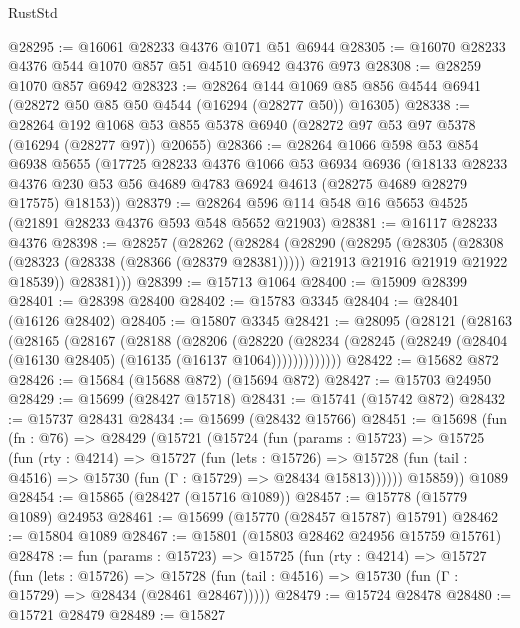 \begin{lexlean}{RustStd}
\begin{coremodule}
@28295 := @16061 @28233 @4376 @1071 @51 @6944
@28305 := @16070 @28233 @4376 @544 @1070 @857 @51 @4510 @6942 @4376 @973
@28308 := @28259 @1070 @857 @6942
@28323 := @28264
    @144
    @1069
    @85
    @856
    @4544
    @6941
    (@28272 @50 @85 @50 @4544 (@16294 (@28277 @50)) @16305)
@28338 := @28264
    @192
    @1068
    @53
    @855
    @5378
    @6940
    (@28272 @97 @53 @97 @5378 (@16294 (@28277 @97)) @20655)
@28366 := @28264
    @1066
    @598
    @53
    @854
    @6938
    @5655
    (@17725
      @28233
      @4376
      @1066
      @53
      @6934
      @6936
      (@18133
        @28233
        @4376
        @230
        @53
        @56
        @4689
        @4783
        @6924
        @4613
        (@28275 @4689 @28279 @17575)
        @18153))
@28379 := @28264 @596 @114 @548 @16 @5653 @4525 (@21891 @28233 @4376 @593 @548 @5652 @21903)
@28381 := @16117 @28233 @4376
@28398 := @28257
    (@28262
      (@28284
        (@28290
          (@28295
            (@28305
              (@28308 (@28323 (@28338 (@28366 (@28379 @28381)))))
              @21913
              @21916
              @21919
              @21922
              @18539))
          @28381)))
@28399 := @15713 @1064
@28400 := @15909 @28399
@28401 := @28398 @28400
@28402 := @15783 @3345
@28404 := @28401 (@16126 @28402)
@28405 := @15807 @3345
@28421 := @28095
    (@28121
      (@28163
        (@28165
          (@28167
            (@28188
              (@28206
                (@28220
                  (@28234 (@28245 (@28249 (@28404 (@16130 @28405) (@16135 (@16137 @1064)))))))))))))
@28422 := @15682 @872
@28426 := @15684 (@15688 @872) (@15694 @872)
@28427 := @15703 @24950
@28429 := @15699 (@28427 @15718)
@28431 := @15741 (@15742 @872)
@28432 := @15737 @28431
@28434 := @15699 (@28432 @15766)
@28451 := @15698
    (fun (fn : @76) =>
    @28429
      (@15721
        (@15724
          (fun (params : @15723) =>
          @15725
            (fun (rty : @4214) =>
            @15727
              (fun (lets : @15726) =>
              @15728 (fun (tail : @4516) => @15730 (fun (Γ : @15729) => @28434 @15813))))))
        @15859))
    @1089
@28454 := @15865 (@28427 (@15716 @1089))
@28457 := @15778 (@15779 @1089) @24953
@28461 := @15699 (@15770 (@28457 @15787) @15791)
@28462 := @15804 @1089
@28467 := @15801 (@15803 @28462 @24956 @15759 @15761)
@28478 := fun (params : @15723) =>
  @15725
    (fun (rty : @4214) =>
    @15727
      (fun (lets : @15726) =>
      @15728 (fun (tail : @4516) => @15730 (fun (Γ : @15729) => @28434 (@28461 @28467)))))
@28479 := @15724 @28478
@28480 := @15721 @28479
@28489 := @15827

\end{coremodule}
\end{lexlean}
